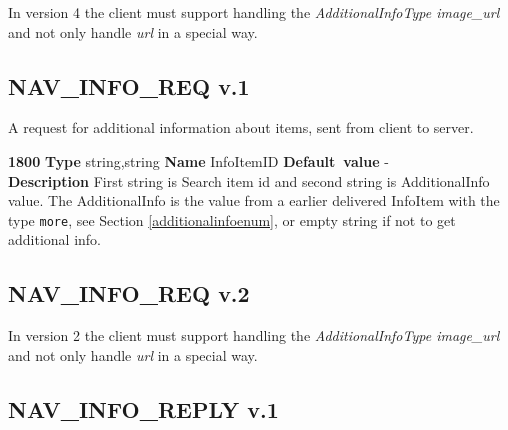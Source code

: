\documentclass[a4paper]{article}
\begin{document}
In version 4 the client must support handling the \emph{AdditionalInfoType 
image\_url} and not only handle \emph{url} in a special way.

\subsection{NAV\_INFO\_REQ v.1}

A request for additional information about items, sent
from client to server.

\begin{list}{\textbf{ParamID}}{}
\item \textbf{1800} \textbf{Type} string,string \textbf{Name} InfoItemID
                 \textbf{Default~value} - \\
  \label{InfoItemID}
  \textbf{Description} First string is Search item id and second string is
  AdditionalInfo value. The AdditionalInfo is the value from a earlier
  delivered InfoItem with the type {\tt more}, see Section 
  \ref{additionalinfoenum}, or empty string if not to get additional info.
\end{list}

\subsection{NAV\_INFO\_REQ v.2}

In version 2 the client must support handling the \emph{AdditionalInfoType 
image\_url} and not only handle \emph{url} in a special way.


\subsection{NAV\_INFO\_REPLY v.1}
\end{document}

